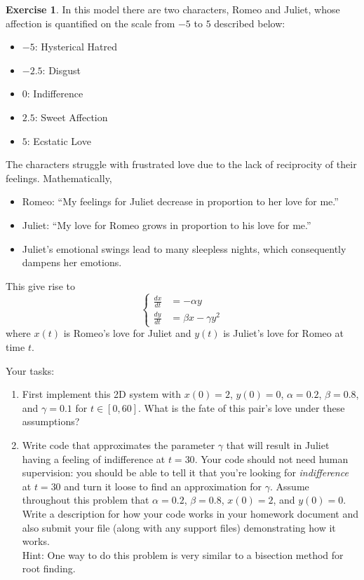 \documentclass[
]{book}
\providecommand{\tightlist}{%
  \setlength{\itemsep}{0pt}\setlength{\parskip}{0pt}}
\theoremstyle{definition}
\theoremstyle{definition}
\theoremstyle{definition}
\newtheorem{exercise}{Exercise}[chapter]
\theoremstyle{remark}
\begin{document}
\begin{exercise}
\protect\hypertarget{exr:unnamed-chunk-502}{}{\label{exr:unnamed-chunk-502} }In this model there are two characters, Romeo and Juliet, whose
affection is quantified on the scale from \(-5\) to \(5\) described below:

\begin{itemize}
\tightlist
\item
  \(-5\): Hysterical Hatred
\item
  \(-2.5\): Disgust
\item
  \(0\): Indifference
\item
  \(2.5\): Sweet Affection
\item
  \(5\): Ecstatic Love
\end{itemize}

The characters struggle with frustrated love due to the lack of
reciprocity of their feelings. Mathematically,

\begin{itemize}
\item
  Romeo: ``My feelings for Juliet decrease in proportion to her love
  for me.''
\item
  Juliet: ``My love for Romeo grows in proportion to his love for me.''
\item
  Juliet's emotional swings lead to many sleepless nights, which
  consequently dampens her emotions.
\end{itemize}

This give rise to
\[\left\{ \begin{array}{ll} \frac{dx}{dt} &= -\alpha y \\ \frac{dy}{dt} &= \beta x -
            \gamma y^2 \end{array} \right.\] where \(x(t)\) is Romeo's
love for Juliet and \(y(t)\) is Juliet's love for Romeo at time \(t\).

Your tasks:

\begin{enumerate}
\def\labelenumi{\alph{enumi}.}
\item
  First implement this 2D system with \(x(0) = 2\), \(y(0)=0\),
  \(\alpha=0.2\), \(\beta=0.8\), and \(\gamma=0.1\) for \(t \in [0,60]\). What
  is the fate of this pair's love under these assumptions?
\item
  Write code that approximates the parameter \(\gamma\) that will result
  in Juliet having a feeling of indifference at \(t=30\). Your code
  should not need human supervision: you should be able to tell it
  that you're looking for \emph{indifference} at \(t=30\) and turn it loose
  to find an approximation for \(\gamma\). Assume throughout this
  problem that \(\alpha=0.2\), \(\beta=0.8\), \(x(0)=2\), and \(y(0)=0\).
  Write a description for how your code works in your homework
  document and also submit your file (along with any support files)
  demonstrating how it works.\\
  Hint: One way to do this problem is very similar to a bisection
  method for root finding.


\end{enumerate}
\end{exercise}
\end{document}
